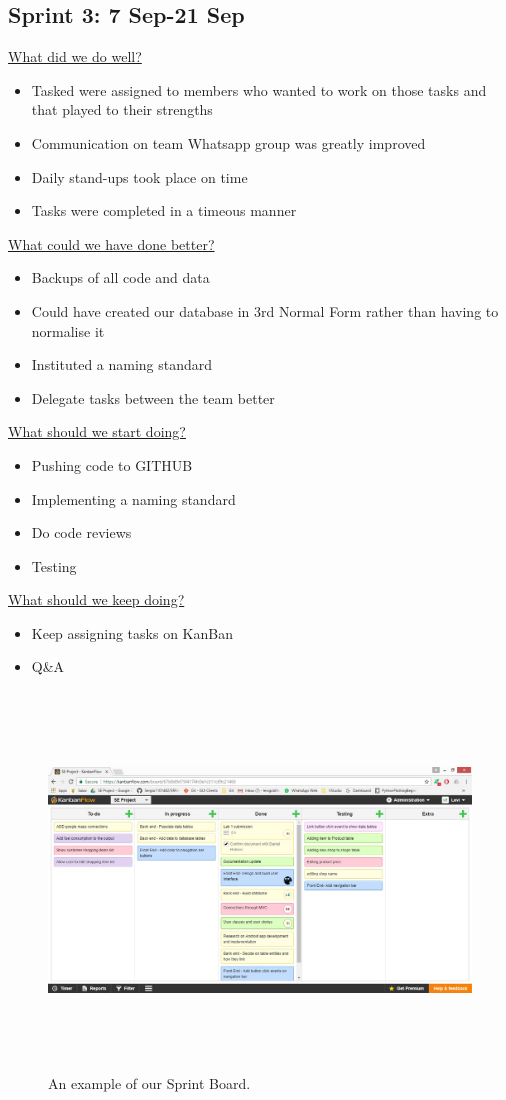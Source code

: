 \documentclass[12pt]{article}
\begin{document}
\subsection{Sprint 3: 7 Sep-21 Sep}
\underline{What did we do well?}
\begin{itemize}
\item Tasked were assigned to members who wanted to work on those tasks and that played to their strengths
\item Communication on team Whatsapp group was greatly improved 
\item Daily stand-ups took place on time
\item Tasks were completed in a timeous manner
\end{itemize}
\underline{What could we have done better?}
\begin{itemize}
\item Backups of all code and data
\item Could have created our database in 3rd Normal Form rather than having to normalise it
\item Instituted a naming standard
\item Delegate tasks between the team better
\end{itemize}
\underline{What should we start doing?}
\begin{itemize}
\item Pushing code to GITHUB 
\item Implementing a naming standard
\item Do code reviews
\item Testing
\end{itemize}
\underline{What should we keep doing?}
\begin{itemize}
\item Keep assigning tasks on KanBan
\item Q\&A
\end{itemize}

\begin{figure}[H]
  \includegraphics[width=15cm,height=10cm]{SprintBoard.jpg}
  \centering
  \caption{An example of our Sprint Board.}
  \label{fig:Sprint Board}
\end{figure}
\end{document}
